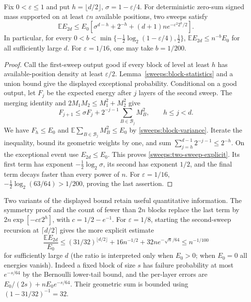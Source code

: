 \begin{proposition}\label{sweeps:two-sweep}
Fix $0<\varepsilon\le1$ and put $h=\lfloor d/2\rfloor$,
$\sigma=1-\varepsilon/4$.  For deterministic zero-sum signed mass supported
on at least $\varepsilon n$ available positions, two sweeps satisfy
\begin{equation}\label{sweeps:two-sweep-explicit}
 \mathbb E E_{2d}\le E_0\left[
 \sigma^{d-h}+2^{-h}+(d+1)n e^{-\varepsilon^2 2^h/2}\right].
\end{equation}
In particular, for every
$0<b<\min\{-\tfrac12\log_2(1-\varepsilon/4),\tfrac12\}$,
$\mathbb E E_{2d}\le n^{-b}E_0$ for all sufficiently large $d$.
For $\varepsilon=1/16$, one may take $b=1/200$.
\end{proposition}
\begin{proof}
Call the first-sweep output good if every block of level at least $h$ has
available-position density at least $\varepsilon/2$.  Lemma~\ref{sweeps:block-statistics}
and a union bound give the displayed exceptional probability.  Conditional
on a good output, let $F_j$ be the expected energy after $j$ layers of the
second sweep.  The merging identity and $2M_1M_2\le M_1^2+M_2^2$ give
\[
 F_{j+1}\le\sigma F_j+2^{-j-1}\sum_{B\in\mathcal B_j}M_B^2,
 \qquad h\le j<d.
\]
We have $F_h\le E_0$ and
$\mathbb E\sum_{B\in\mathcal B_j}M_B^2\le E_0$ by
\eqref{sweeps:block-variance}.  Iterate the inequality, bound its geometric
weights by one, and sum $\sum_{j=h}^{d-1}2^{-j-1}\le2^{-h}$.
On the exceptional event use $E_{2d}\le E_0$.  This proves
\eqref{sweeps:two-sweep-explicit}.  Its first term has exponent
$-\tfrac12\log_2\sigma$, its second has exponent $1/2$, and the final term
decays faster than every power of $n$.  For $\varepsilon=1/16$,
$-\tfrac12\log_2(63/64)>1/200$, proving the last assertion.
\end{proof}

Two variants of the displayed bound retain useful quantitative information.
The symmetry proof and the count of fewer than $2n$ blocks replace the last
term by $2n\exp[-c\varepsilon2^h]$, with
$c=1/2-e^{-1}$.  For $\varepsilon=1/8$, starting the second-sweep recursion
at $\lceil d/2\rceil$ gives the more explicit estimate
\begin{equation}\label{sweeps:eighth-bound}
 \frac{\mathbb E E_{2d}}{E_0}
 \le(31/32)^{\lfloor d/2\rfloor}
      +16n^{-1/2}+32n e^{-\sqrt n/64}
 \le n^{-1/100}
\end{equation}
for sufficiently large $d$ (the ratio is interpreted only when $E_0>0$;
when $E_0=0$ all energies vanish).  Indeed a fixed block of size $s$ has
failure probability at most $e^{-s/64}$ by the Bernoulli lower-tail bound,
and the per-layer errors are $E_0/(2s)+nE_0e^{-s/64}$.
Their geometric sum is bounded using $(1-31/32)^{-1}=32$.

